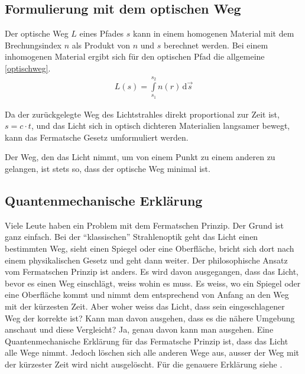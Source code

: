 \subsection{Formulierung mit dem optischen Weg}
Der optische Weg $L$  eines Pfades $s$ kann in einem homogenen Material 
mit dem Brechungsindex $n$ als Produkt von $n$ und $s$ berechnet werden.
Bei einem inhomogenen Material ergibt sich für den optischen Pfad die allgemeine \eqref{optischweg}.
\begin{align}
	L(s) = \int\limits_{s_1}^{s_2} n(r) \,\mathrm d\vec s 
	\label{optischweg}
\end{align}

Da der zurückgelegte Weg des Lichtstrahles direkt proportional zur Zeit ist, $s = c \cdot t$,
und das Licht sich in optisch dichteren Materialien langsamer bewegt,
kann das Fermatsche Gesetz umformuliert werden\cite{Definition}. 


\begin{postulat}
Der Weg, den das Licht nimmt, um von einem Punkt zu einem anderen zu gelangen, ist stets so, dass der optische Weg minimal ist.
\end{postulat}

\subsection{Quantenmechanische Erklärung}
Viele Leute haben ein Problem mit dem Fermatschen Prinzip. 
Der Grund ist ganz einfach. 
Bei der ``klassischen'' Strahlenoptik geht das Licht einen bestimmten Weg, 
sieht einen Spiegel oder eine Oberfläche, bricht sich dort nach einem 
physikalischen Gesetz und geht dann weiter.
Der philosophische Ansatz vom Fermatschen Prinzip ist anders. 
Es wird davon ausgegangen, dass das Licht, bevor es einen Weg einschlägt, 
weiss wohin es muss. Es weiss, wo ein Spiegel oder eine Oberfläche kommt und 
nimmt dem entsprechend von Anfang an den Weg mit der kürzesten Zeit.
Aber woher weiss das Licht, dass sein eingeschlagener Weg der korrekte ist?
Kann man davon ausgehen, dass es die nähere Umgebung anschaut und diese Vergleicht?
Ja, genau davon kann man ausgehen. Eine Quantenmechanische Erklärung für das Fermatsche Prinzip ist, 
dass das Licht alle Wege nimmt. Jedoch löschen sich alle anderen Wege aus, 
ausser der Weg mit der kürzester Zeit wird nicht ausgelöscht.
Für die genauere Erklärung siehe \cite{quanten}.
